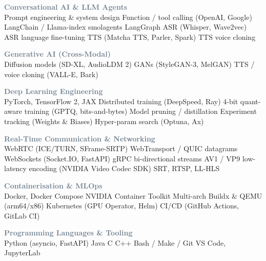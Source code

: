 \documentclass[9pt,a4paper,ragged2e]{altacv}
\begin{document}
\begin{paracol}{2}
\vspace{0.5pt}

\textcolor{SlateGrey}{\textbf{Conversational AI \& LLM Agents}}\\
Prompt engineering \& system design \textbar{} Function / tool calling (OpenAI, Google) \textbar{} LangChain / Llama-index \textbar{} smolagents \textbar{} LangGraph \textbar{} ASR (Whisper, Wave2vec) \textbar{} ASR language fine-tuning \textbar{} TTS (Matcha TTS, Parler, Spark) \textbar{} TTS voice cloning

\vspace{0.5pt}

\textcolor{SlateGrey}{\textbf{Generative AI (Cross-Modal)}}\\
Diffusion models (SD-XL, AudioLDM 2) \textbar{} GANs (StyleGAN-3, MelGAN) \textbar{} TTS / voice cloning (VALL-E, Bark)

\vspace{0.5pt}

\textcolor{SlateGrey}{\textbf{Deep Learning Engineering}}\\
PyTorch, TensorFlow 2, JAX \textbar{} Distributed training (DeepSpeed, Ray) \textbar{} 4-bit quant-aware training (GPTQ, bits-and-bytes) \textbar{} Model pruning / distillation \textbar{} Experiment tracking (Weights \& Biases) \textbar{} Hyper-param search (Optuna, Ax)

\vspace{0.5pt}

\textcolor{SlateGrey}{\textbf{Real-Time Communication \& Networking}}\\
WebRTC (ICE/TURN, SFrame-SRTP) \textbar{} WebTransport / QUIC datagrams \textbar{} WebSockets (Socket.IO, FastAPI) \textbar{} gRPC bi-directional streams \textbar{} AV1 / VP9 low-latency encoding (NVIDIA Video Codec SDK) \textbar{} SRT, RTSP, LL-HLS

\vspace{0.5pt}

\textcolor{SlateGrey}{\textbf{Containerisation \& MLOps}}\\
Docker, Docker Compose \textbar{} NVIDIA Container Toolkit \textbar{} Multi-arch Buildx \& QEMU (arm64/x86) \textbar{} Kubernetes (GPU Operator, Helm) \textbar{} CI/CD (GitHub Actions, GitLab CI)

\vspace{0.5pt}

\textcolor{SlateGrey}{\textbf{Programming Languages \& Tooling}}\\
Python (asyncio, FastAPI) \textbar{} Java \textbar{} C \textbar{} C++ \textbar{} Bash / Make / Git \textbar{} VS Code, JupyterLab
\end{paracol}
\end{document}
